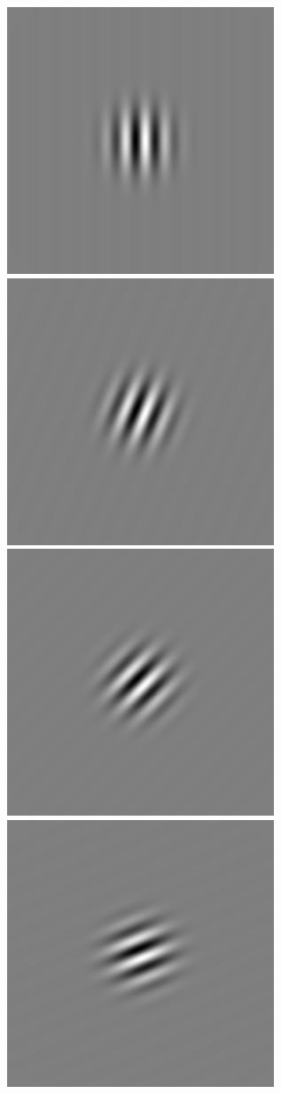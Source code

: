 \begin{figure}
\begin{center}
 \includegraphics[scale=0.1]{ch4/figures/rGabor4_0.jpg}
 \includegraphics[scale=0.1]{ch4/figures/rGabor4_1.jpg}
 \includegraphics[scale=0.1]{ch4/figures/rGabor4_2.jpg}
 \includegraphics[scale=0.1]{ch4/figures/rGabor4_3.jpg}

\end{center}
\end{figure}
